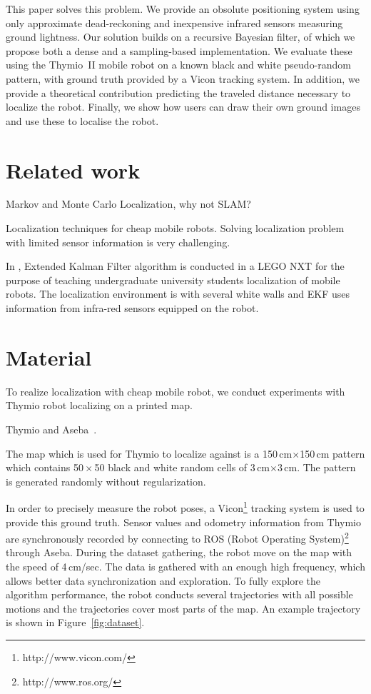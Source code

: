 \documentclass[letterpaper, 10pt, conference]{ieeeconf}
\newcommand{\fig}[1]{Figure~\ref{fig:#1}}
\begin{document}
This paper solves this problem.
We provide an obsolute positioning system using only approximate dead-reckoning and inexpensive infrared sensors measuring ground lightness.
Our solution builds on a recursive Bayesian filter, of which we propose both a dense and a sampling-based implementation.
We evaluate these using the Thymio~II mobile robot on a known black and white pseudo-random pattern, with ground truth provided by a Vicon tracking system.
In addition, we provide a theoretical contribution predicting the traveled distance necessary to localize the robot.
Finally, we show how users can draw their own ground images and use these to localise the robot.

\section{Related work}

Markov and Monte Carlo Localization, why not SLAM?

Localization techniques for cheap mobile robots.
Solving localization problem with limited sensor information is very challenging. 

In \cite{pinto2012localization}, Extended Kalman Filter algorithm is conducted in a LEGO NXT for the purpose of teaching undergraduate university students localization of mobile robots.
The localization environment is with several white walls and EKF uses information from infra-red sensors equipped on the robot.


\section{Material}
To realize localization with cheap mobile robot, we conduct experiments with Thymio robot localizing on a printed map.

Thymio and Aseba~\cite{magnenat2012arso, aseba2011tmech, riedo2013arso}.


The map which is used for Thymio to localize against is a 150\,cm$\times$150\,cm pattern which contains 50\,$\times$\,50 black and white random cells of 3\,cm$\times$3\,cm. 
The pattern is generated randomly without regularization.

In order to precisely measure the robot poses, a Vicon\footnote{http://www.vicon.com/} tracking system is used to provide this ground truth.
Sensor values and odometry information from Thymio are synchronously recorded by connecting to ROS (Robot Operating System)\footnote{http://www.ros.org/} through Aseba.
During the dataset gathering, the robot move on the map with the speed of 4\,cm/sec. 
The data is gathered with an enough high frequency, which allows better data synchronization and exploration.
To fully explore the algorithm performance, the robot conducts several trajectories with all possible motions and the trajectories cover most parts of the map. 
An example trajectory is shown in \fig{dataset}.
\end{document}
